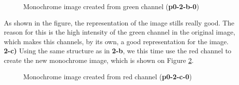 \documentclass[12pt,a4paper]{article}
\begin{document}
\begin{figure}[!h]
	\centering
	{%
		\setlength{\fboxsep}{1pt}%
		\setlength{\fboxrule}{1pt}%
	}%
	\caption{Monochrome image created from green channel (\textbf{p0-2-b-0})}
	\label{fig:img-green}
\end{figure}

As shown in the figure, the representation of the image stills really good. The reason for this is the high intensity of the green channel in the original image, which makes this channels, by its own, a good representation for the image. \\

\textbf{2-c) } Using the same structure as in \textbf{2-b}, we this time use the red channel to create the new monochrome image, which is shown on Figure \ref{fig:img-red}.

\begin{figure}[!h]
	\centering
	{%
		\setlength{\fboxsep}{1pt}%
		\setlength{\fboxrule}{1pt}%
	}%
	\caption{Monochrome image created from red channel (\textbf{p0-2-c-0})}
	\label{fig:img-red}
\end{figure}
\end{document}
